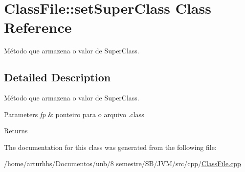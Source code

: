 \hypertarget{classClassFile_1_1setSuperClass}{}\section{Class\+File\+:\+:set\+Super\+Class Class Reference}
\label{classClassFile_1_1setSuperClass}


Método que armazena o valor de Super\+Class.  




\subsection{Detailed Description}
Método que armazena o valor de Super\+Class. 


\begin{DoxyParams}{Parameters}
{\em fp} & ponteiro para o arquivo .class \\
\hline
\end{DoxyParams}
\begin{DoxyReturn}{Returns}

\end{DoxyReturn}


The documentation for this class was generated from the following file\+:\begin{DoxyCompactItemize}
\item 
/home/arturhbs/\+Documentos/unb/8 semestre/\+S\+B/\+J\+V\+M/src/cpp/\hyperlink{ClassFile_8cpp}{Class\+File.\+cpp}\end{DoxyCompactItemize}
